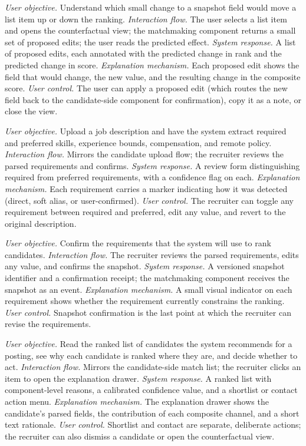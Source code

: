 \emph{User objective.} Understand which small change to a snapshot field would move a list item up or down the ranking.
\emph{Interaction flow.} The user selects a list item and opens the counterfactual view; the matchmaking component returns a small set of proposed edits; the user reads the predicted effect.
\emph{System response.} A list of proposed edits, each annotated with the predicted change in rank and the predicted change in score.
\emph{Explanation mechanism.} Each proposed edit shows the field that would change, the new value, and the resulting change in the composite score.
\emph{User control.} The user can apply a proposed edit (which routes the new field back to the candidate-side component for confirmation), copy it as a note, or close the view.

\emph{User objective.} Upload a job description and have the system extract required and preferred skills, experience bounds, compensation, and remote policy.
\emph{Interaction flow.} Mirrors the candidate upload flow; the recruiter reviews the parsed requirements and confirms.
\emph{System response.} A review form distinguishing required from preferred requirements, with a confidence flag on each.
\emph{Explanation mechanism.} Each requirement carries a marker indicating how it was detected (direct, soft alias, or user-confirmed).
\emph{User control.} The recruiter can toggle any requirement between required and preferred, edit any value, and revert to the original description.

\emph{User objective.} Confirm the requirements that the system will use to rank candidates.
\emph{Interaction flow.} The recruiter reviews the parsed requirements, edits any value, and confirms the snapshot.
\emph{System response.} A versioned snapshot identifier and a confirmation receipt; the matchmaking component receives the snapshot as an event.
\emph{Explanation mechanism.} A small visual indicator on each requirement shows whether the requirement currently constrains the ranking.
\emph{User control.} Snapshot confirmation is the last point at which the recruiter can revise the requirements.

\emph{User objective.} Read the ranked list of candidates the system recommends for a posting, see why each candidate is ranked where they are, and decide whether to act.
\emph{Interaction flow.} Mirrors the candidate-side match list; the recruiter clicks an item to open the explanation drawer.
\emph{System response.} A ranked list with component-level reasons, a calibrated confidence value, and a shortlist or contact action menu.
\emph{Explanation mechanism.} The explanation drawer shows the candidate's parsed fields, the contribution of each composite channel, and a short text rationale.
\emph{User control.} Shortlist and contact are separate, deliberate actions; the recruiter can also dismiss a candidate or open the counterfactual view.

